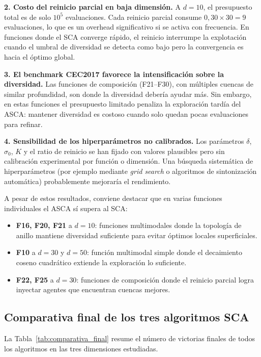 \documentclass[12pt,a4paper]{article}
\begin{document}
\textbf{2. Costo del reinicio parcial en baja dimensión.} A $d=10$, el presupuesto total es de solo $10^5$ evaluaciones. Cada reinicio parcial consume $0{,}30 \times 30 = 9$ evaluaciones, lo que es un overhead significativo si se activa con frecuencia. En funciones donde el SCA converge rápido, el reinicio interrumpe la explotación cuando el umbral de diversidad se detecta como bajo pero la convergencia es hacia el óptimo global.

\textbf{3. El benchmark CEC2017 favorece la intensificación sobre la diversidad.} Las funciones de composición (F21--F30), con múltiples cuencas de similar profundidad, son donde la diversidad debería ayudar más. Sin embargo, en estas funciones el presupuesto limitado penaliza la exploración tardía del ASCA: mantener diversidad es costoso cuando solo quedan pocas evaluaciones para refinar.

\textbf{4. Sensibilidad de los hiperparámetros no calibrados.} Los parámetros $\delta$, $\sigma_0$, $K$ y el ratio de reinicio se han fijado con valores plausibles pero sin calibración experimental por función o dimensión. Una búsqueda sistemática de hiperparámetros (por ejemplo mediante \textit{grid search} o algoritmos de sintonización automática) probablemente mejoraría el rendimiento.

A pesar de estos resultados, conviene destacar que en varias funciones individuales el ASCA sí supera al SCA:

\begin{itemize}
  \item \textbf{F16, F20, F21} a $d=10$: funciones multimodales donde la topología de anillo mantiene diversidad suficiente para evitar óptimos locales superficiales.
  \item \textbf{F10} a $d=30$ y $d=50$: función multimodal simple donde el decaimiento coseno cuadrático extiende la exploración lo suficiente.
  \item \textbf{F22, F25} a $d=30$: funciones de composición donde el reinicio parcial logra inyectar agentes que encuentran cuencas mejores.
\end{itemize}

\subsection{Comparativa final de los tres algoritmos SCA}

La Tabla~\ref{tab:comparativa_final} resume el número de victorias finales de todos los algoritmos en las tres dimensiones estudiadas.
\end{document}
